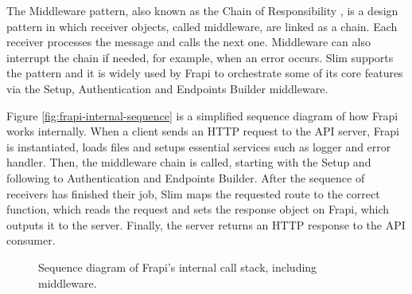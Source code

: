 The Middleware pattern, also known as the Chain of Responsibility \cite{chain-of-responsibility}, is a design pattern in which receiver objects, called middleware, are linked as a chain. Each receiver processes the message and calls the next one. Middleware can also interrupt the chain if needed, for example, when an error occurs. Slim supports the pattern \cite{slim-middleware-doc} and it is widely used by Frapi to orchestrate some of its core features via the Setup, Authentication and Endpoints Builder middleware.

Figure \autoref{fig:frapi-internal-sequence} is a simplified sequence diagram of how Frapi works internally. When a client sends an HTTP request to the API server, Frapi is instantiated, loads files and setups essential services such as logger and error handler. Then, the middleware chain is called, starting with the Setup and following to Authentication and Endpoints Builder. After the sequence of receivers has finished their job, Slim maps the requested route to the correct function, which reads the request and sets the response object on Frapi, which outputs it to the server. Finally, the server returns an HTTP response to the API consumer.

\begin{figure}[htbp]
  \centering
  
  \caption{Sequence diagram of Frapi's internal call stack, including middleware.}
  \label{fig:frapi-internal-sequence}
\end{figure}